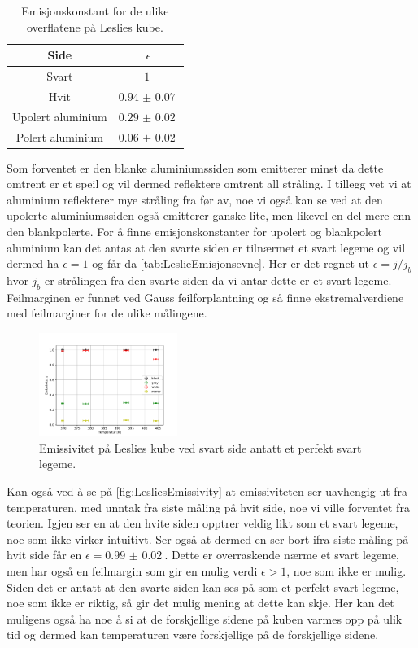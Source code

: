 \begin{table}
  \centering
  \caption{Emisjonskonstant for de ulike overflatene på Leslies kube.}
  \begin{tabular}{cc}
    \toprule
    Side & $\epsilon$ \\
    \midrule
    Svart & $\SI{1}{}$ \\
    Hvit & $\SI{0.94(7)}{}$ \\
    Upolert aluminium & $\SI{0.29(2)}{}$ \\
    Polert aluminium & $\SI{0.06(2)}{}$ \\
    \bottomrule
  \end{tabular}
  \label{tab:LeslieEmisjonsevne}
\end{table}

Som forventet er den blanke aluminiumssiden som emitterer minst da dette omtrent er et speil og vil dermed reflektere omtrent all stråling. I tillegg vet vi at aluminium reflekterer mye stråling fra før av, noe vi også kan se ved at den upolerte aluminiumssiden også emitterer ganske lite, men likevel en del mere enn den blankpolerte. For å finne emisjonskonstanter for upolert og blankpolert aluminium kan det antas at den svarte siden er tilnærmet et svart legeme og vil dermed ha $\epsilon = 1$ og får da \autoref{tab:LeslieEmisjonsevne}. Her er det regnet ut $\epsilon = j/j_{b}$ hvor $j_{b}$ er strålingen fra den svarte siden da vi antar dette er et svart legeme. Feilmarginen er funnet ved Gauss feilforplantning og så finne ekstremalverdiene med feilmarginer for de ulike målingene.

\begin{figure}
  \centering
  \includegraphics[width=0.4\textwidth]{../code/LC_emissivity.pdf}
  \caption{Emissivitet på Leslies kube ved svart side antatt et perfekt svart legeme.}
  \label{fig:LesliesEmissivity}
\end{figure}

Kan også ved å se på \autoref{fig:LesliesEmissivity} at emissiviteten ser uavhengig ut fra temperaturen, med unntak fra siste måling på hvit side, noe vi ville forventet fra teorien. Igjen ser en at den hvite siden opptrer veldig likt som et svart legeme, noe som ikke virker intuitivt. Ser også at dermed en ser bort ifra siste måling på hvit side får en $\epsilon = \SI{0.99(2)}{}$. Dette er overraskende nærme et svart legeme, men har også en feilmargin som gir en mulig verdi $\epsilon > 1$, noe som ikke er mulig. Siden det er antatt at den svarte siden kan ses på som et perfekt svart legeme, noe som ikke er riktig, så gir det mulig mening at dette kan skje. Her kan det muligens også ha noe å si at de forskjellige sidene på kuben varmes opp på ulik tid og dermed kan temperaturen være forskjellige på de forskjellige sidene.

